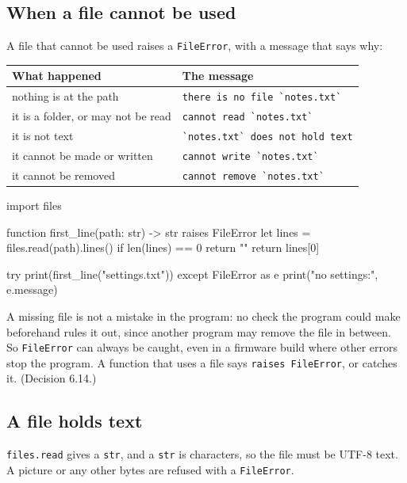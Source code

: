 \subsection{When a file cannot be used}

A file that cannot be used raises a \verb|FileError|, with a message
that says why:

\begin{center}
\begin{tabular}{ll}
\toprule
What happened & The message \\
\midrule
nothing is at the path & \verb|there is no file `notes.txt`| \\
it is a folder, or may not be read & \verb|cannot read `notes.txt`| \\
it is not text & \verb|`notes.txt` does not hold text| \\
it cannot be made or written & \verb|cannot write `notes.txt`| \\
it cannot be removed & \verb|cannot remove `notes.txt`| \\
\bottomrule
\end{tabular}
\end{center}

\begin{zeno}
import files

function first_line(path: str) -> str raises FileError {
    let lines = files.read(path).lines()
    if len(lines) == 0 {
        return ""
    }
    return lines[0]
}

try {
    print(first_line("settings.txt"))
} except FileError as e {
    print("no settings:", e.message)
}
\end{zeno}

A missing file is not a mistake in the program: no check the program
could make beforehand rules it out, since another program may remove
the file in between. So \verb|FileError| can always be caught, even in
a firmware build where other errors stop the program. A function that
uses a file says \verb|raises FileError|, or catches it.
(Decision 6.14.)

\subsection{A file holds text}

\verb|files.read| gives a \verb|str|, and a \verb|str| is characters,
so the file must be UTF-8 text. A picture or any other bytes are
refused with a \verb|FileError|.

